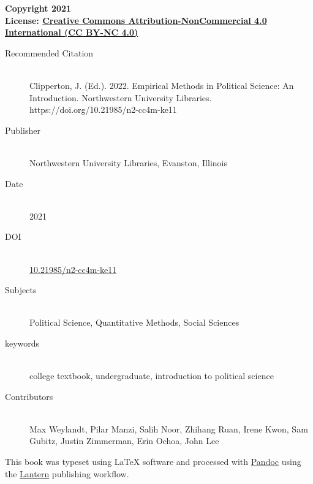 \documentclass{book}
\newcommand{\booklicense}{\href{https://creativecommons.org/licenses/by-nc/4.0/}{Creative
Commons Attribution-NonCommercial 4.0 International (CC BY-NC 4.0)}}
\begin{document}
\begin{flushleft}

\textbf{Copyright \textcopyright{} 2021  \\
License: \booklicense}\\[11pt] 


\vspace*{\fill}

\begin{description}
  \item[Recommended Citation] \hfill \\ Clipperton, J. (Ed.). 2022. Empirical
Methods in Political Science: An Introduction. Northwestern University
Libraries. https://doi.org/10.21985/n2-cc4m-ke11
  \item[Publisher] \hfill \\ Northwestern University Libraries, Evanston,
Illinois
  \item[Date] \hfill \\ 2021
          \item[DOI] \hfill \\ \href{https://doi.org/10.21985/n2-cc4m-ke11}{10.21985/n2-cc4m-ke11}
    \item[Subjects] \hfill \\ Political Science, Quantitative Methods, Social
Sciences
  \item[keywords] \hfill \\ college textbook, undergraduate, introduction to
political science
    \item[Contributors] \hfill \\ Max Weylandt, Pilar Manzi, Salih
Noor, Zhihang Ruan, Irene Kwon, Sam Gubitz, Justin Zimmerman, Erin Ochoa, John
Lee
  
\end{description}


\vspace*{\fill}

This book was typeset using \LaTeX{} software and processed with \href{https://pandoc.org}{Pandoc} using the \href{http://lantern.northwestern.pub}{Lantern} publishing workflow.\\

\end{flushleft}

\addtocounter{page}{2}

\end{document}
